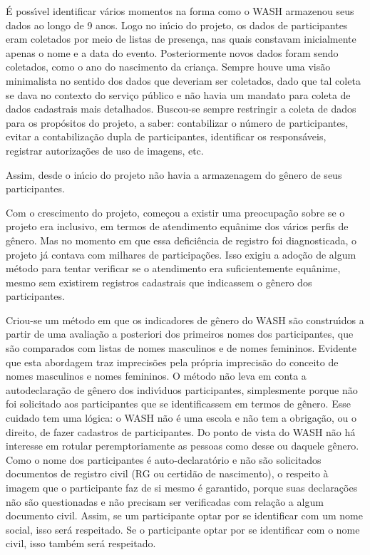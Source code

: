 \documentclass[
12pt,		%
openright,	%
twoside,  %
a4paper,			%
chapter=TITLE,		%
english,			%
french,				%
spanish,			%
brazil				%
]{USPSC-classe/USPSC}
\begin{document}
\'E poss\'{\i}vel identificar v\'arios momentos na forma como o WASH armazenou seus dados ao longo de 9 anos. Logo no in\'{\i}cio do projeto, os dados de participantes eram coletados por meio de listas de presen\c{c}a, nas quais constavam inicialmente apenas o nome e a data do evento. Posteriormente novos dados foram sendo coletados, como o ano do nascimento da crian\c{c}a. Sempre houve uma vis\~ao minimalista no sentido dos dados que deveriam ser coletados, dado que tal coleta se dava no contexto do servi\c{c}o p\'ublico e n\~ao havia um mandato para coleta de dados cadastrais mais detalhados. Buscou-se sempre restringir a coleta de dados para os prop\'ositos do projeto, a saber: contabilizar o n\'umero de participantes, evitar a contabiliza\c{c}\~ao dupla de participantes, identificar os respons\'aveis, registrar autoriza\c{c}\~oes de uso de imagens, etc.


Assim, desde o in\'{\i}cio do projeto n\~ao havia a armazenagem do g\^enero de seus participantes.


Com o crescimento do projeto, come\c{c}ou a existir uma preocupa\c{c}\~ao sobre se o projeto era inclusivo, em termos de atendimento equ\^anime dos v\'arios perfis de g\^enero. Mas no momento em que essa defici\^encia de registro foi diagnosticada, o projeto j\'a contava com milhares de participa\c{c}\~oes. Isso exigiu a ado\c{c}\~ao de algum m\'etodo para tentar verificar se o atendimento era suficientemente equ\^anime, mesmo sem existirem registros cadastrais que indicassem o g\^enero dos participantes.


Criou-se um m\'etodo em que os indicadores de g\^enero do WASH s\~ao constru\'{\i}dos a partir de uma avalia\c{c}\~ao a posteriori dos primeiros nomes dos participantes, que s\~ao comparados com listas de nomes masculinos e de nomes femininos. Evidente que esta abordagem traz imprecis\~oes pela pr\'opria imprecis\~ao do conceito de nomes masculinos e nomes femininos. O m\'etodo n\~ao leva em conta a autodeclara\c{c}\~ao de g\^enero dos indiv\'{\i}duos participantes, simplesmente porque n\~ao foi solicitado aos participantes que se identificassem em termos de g\^enero. Esse cuidado tem uma l\'ogica: o WASH n\~ao \'e uma escola e n\~ao tem a obriga\c{c}\~ao, ou o direito, de fazer cadastros de participantes. Do ponto de vista do WASH n\~ao h\'a interesse em rotular peremptoriamente as pessoas como desse ou daquele g\^enero. Como o nome dos participantes \'e auto-declarat\'orio e n\~ao s\~ao solicitados documentos de registro civil (RG ou certid\~ao de nascimento), o respeito \`a imagem que o participante faz de si mesmo \'e garantido, porque suas declara\c{c}\~oes n\~ao s\~ao questionadas e n\~ao precisam ser verificadas com rela\c{c}\~ao a algum documento civil. Assim, se um participante optar por se identificar com um nome social, isso ser\'a respeitado. Se o participante optar por se identificar com o nome civil, isso tamb\'em ser\'a respeitado.
\end{document}
